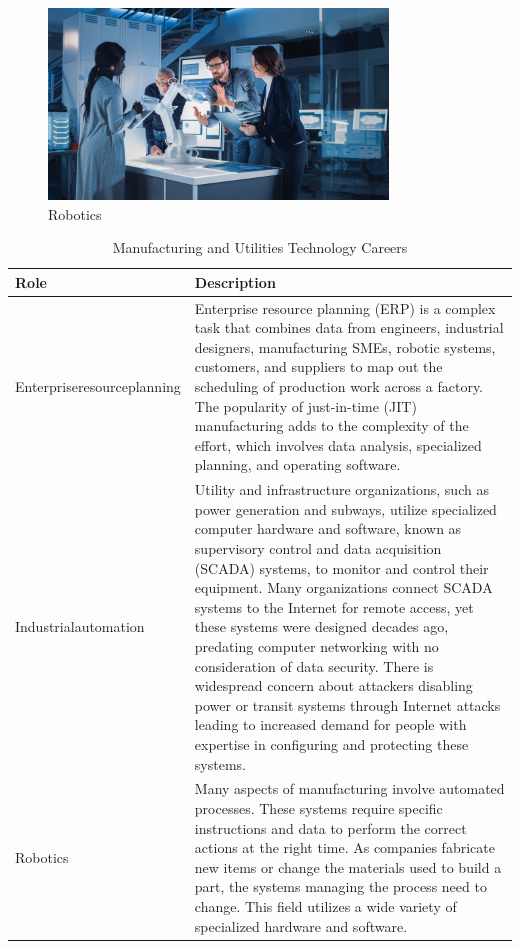 \begin{figure}[H]
	\begin{center}
		\caption{Robotics}
		\vskip 4pt
		\includegraphics[height=2in]{images/careers/iStock-1214111404.small.jpg}
	\end{center}
\end{figure}

\begin{table}[H]
	\begin{center}
		\caption{Manufacturing and Utilities Technology Careers}
		\vskip 4pt
		\begin{tabular}{p{1in}|p{3.4in}} 
			\textbf{Role} & \textbf{Description}\\
			\hline
			Enterprise\linebreak resource\linebreak planning & Enterprise resource planning (ERP) is a complex task that combines data from engineers, industrial designers, manufacturing SMEs, robotic systems, customers, and suppliers to map out the scheduling of production work across a factory. The popularity of just-in-time (JIT) manufacturing adds to the complexity of the effort, which involves data analysis, specialized planning, and operating software.\\
			\hline
			Industrial\linebreak automation & Utility and infrastructure organizations, such as power generation and subways, utilize specialized computer hardware and software, known as supervisory control and data acquisition (SCADA) systems, to monitor and control their equipment. Many organizations connect SCADA systems to the Internet for remote access, yet these systems were designed decades ago, predating computer networking with no consideration of data security. There is widespread concern about attackers disabling power or transit systems through Internet attacks leading to increased demand for people with expertise in configuring and protecting these systems.\\
			\hline
			Robotics & Many aspects of manufacturing involve automated processes. These systems require specific instructions and data to perform the correct actions at the right time. As companies fabricate new items or change the materials used to build a part, the systems managing the process need to change. This field utilizes a wide variety of specialized hardware and software.\\
			\hline
		\end{tabular}
	\end{center}
\end{table}

